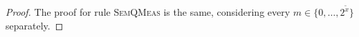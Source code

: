 \begin{proof}

The proof for rule {\scshape SemQMeas} is the same, considering every $m \in \{0, \dots, 2^{\widetilde{x}}\}$ separately.
\end{proof}


